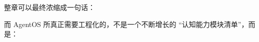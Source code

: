 整章可以最终浓缩成一句话：

\begin{statementbox}
\centering
{}
\end{statementbox}

而 AgentOS 所真正需要工程化的，不是一个不断增长的 ``认知能力模块清单''，而是：

\begin{statementbox}
\centering
{}
\end{statementbox}
